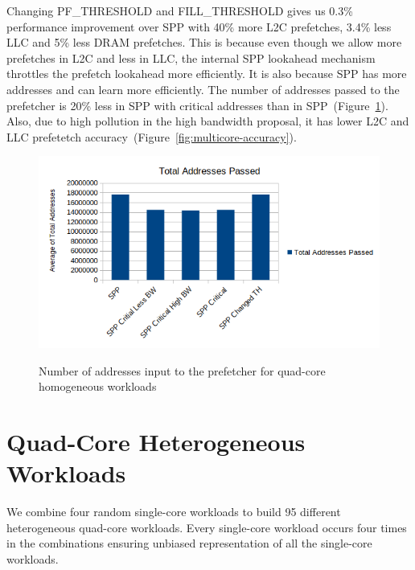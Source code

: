 Changing PF\_THRESHOLD and FILL\_THRESHOLD gives us 0.3\% performance improvement over SPP with 40\% more L2C prefetches, 3.4\% less LLC and 5\% less DRAM prefetches. This is because even though we allow more prefetches in L2C and less in LLC, the internal SPP lookahead mechanism throttles the prefetch lookahead more efficiently. It is also because SPP has more addresses and can learn more efficiently.     
The number of addresses passed to the prefetcher is 20\% less in SPP with critical addresses than in SPP~(Figure~\ref{fig:multicore-addr}). Also, due to high pollution in the high bandwidth proposal, it has lower L2C and LLC prefetetch accuracy~(Figure~\ref{fig:multicore-accuracy}).
\begin{figure}[H]
{\includegraphics[scale=0.7]{images/Total _addresses_homo.png}}
\caption{Number of addresses input to the prefetcher for quad-core homogeneous workloads}
\label{fig:multicore-addr}
\end{figure}

\section{Quad-Core Heterogeneous Workloads}

We combine four random single-core workloads to build 95 different heterogeneous quad-core workloads. Every single-core workload occurs four times in the combinations ensuring unbiased representation of all the single-core workloads. 

